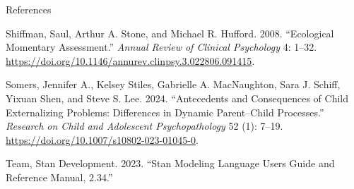 \documentclass[
  ignorenonframetext,
]{beamer}
\newlength{\cslhangindent}
\newenvironment{CSLReferences}[2] %
 {\begin{list}{}{%
  \setlength{\itemindent}{0pt}
  \setlength{\leftmargin}{0pt}
  \setlength{\parsep}{0pt}
  \ifodd #1
   \setlength{\leftmargin}{\cslhangindent}
   \setlength{\itemindent}{-1\cslhangindent}
  \fi
  \setlength{\itemsep}{#2\baselineskip}}}
 {\end{list}}
\begin{document}
\begin{frame}{References}
\begin{CSLReferences}{1}{0}
Shiffman, Saul, Arthur A. Stone, and Michael R. Hufford. 2008.
{``Ecological Momentary Assessment.''} \emph{Annual Review of Clinical
Psychology} 4: 1--32.
\url{https://doi.org/10.1146/annurev.clinpsy.3.022806.091415}.

Somers, Jennifer A., Kelsey Stiles, Gabrielle A. MacNaughton, Sara J.
Schiff, Yixuan Shen, and Steve S. Lee. 2024. {``Antecedents and
{Consequences} of {Child Externalizing Problems}: {Differences} in
{Dynamic Parent}--{Child Processes}.''} \emph{Research on Child and
Adolescent Psychopathology} 52 (1): 7--19.
\url{https://doi.org/10.1007/s10802-023-01045-0}.

Team, Stan Development. 2023. {``Stan {Modeling Language Users Guide}
and {Reference Manual}, 2.34.''}

\end{CSLReferences}
\end{frame}
\end{document}
